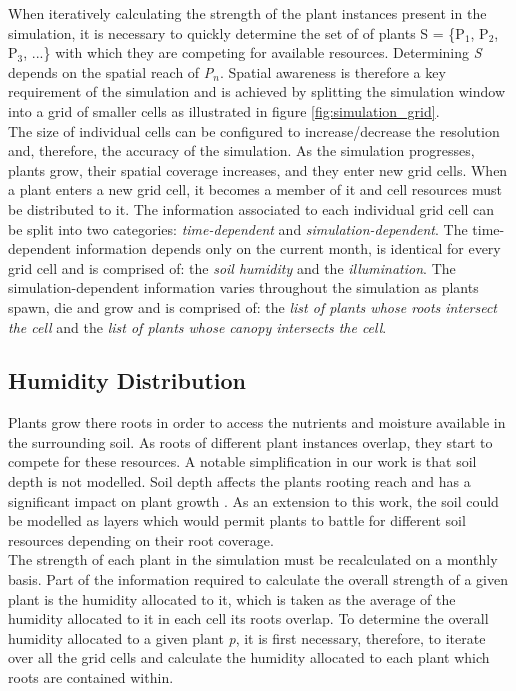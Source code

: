 When iteratively calculating the strength of the plant instances present in the simulation, it is necessary to quickly determine the set of of plants S = \{P$_{1}$, P$_{2}$, P$_{3}$, ...\} with which they are competing for available resources. Determining \textit{S} depends on the spatial reach of \textit{P$_{n}$}. Spatial awareness is therefore a key requirement of the simulation and is achieved by splitting the simulation window into a grid of smaller cells as illustrated in figure \ref{fig:simulation_grid}.\\
The size of individual cells can be configured to increase/decrease the resolution and, therefore, the accuracy of the simulation. As the simulation progresses, plants grow, their spatial coverage increases, and they enter new grid cells. When a plant enters a new grid cell, it becomes a member of it and cell resources must be distributed to it. The information associated to each individual grid cell can be split into two categories: \textit{time-dependent} and \textit{simulation-dependent}. The time-dependent information depends only on the current month, is identical for every grid cell and is comprised of: the \textit{soil humidity} and the \textit{illumination}. The simulation-dependent information varies throughout the simulation as plants spawn, die and grow and is comprised of: the \textit{list of plants whose roots intersect the cell} and the \textit{list of plants whose canopy intersects the cell}.

\subsection{Humidity Distribution} \label{subsec:humidity_distribution}

Plants grow there roots in order to access the nutrients and moisture available in the surrounding soil. As roots of different plant instances overlap, they start to compete for these resources. A notable simplification in our work is that soil depth is not modelled. Soil depth affects the plants rooting reach and has a significant impact on plant growth \cite{Fourcaud2008}. As an extension to this work, the soil could be modelled as layers which would permit plants to battle for different soil resources depending on their root coverage.\\

The strength of each plant in the simulation must be recalculated on a monthly basis. Part of the information required to calculate the overall strength of a given plant is the humidity allocated to it, which is taken as the average of the humidity allocated to it in each cell its roots overlap. To determine the overall humidity allocated to a given plant \textit{p}, it is first necessary, therefore, to iterate over all the grid cells and calculate the humidity allocated to each plant which roots are contained within.\\

